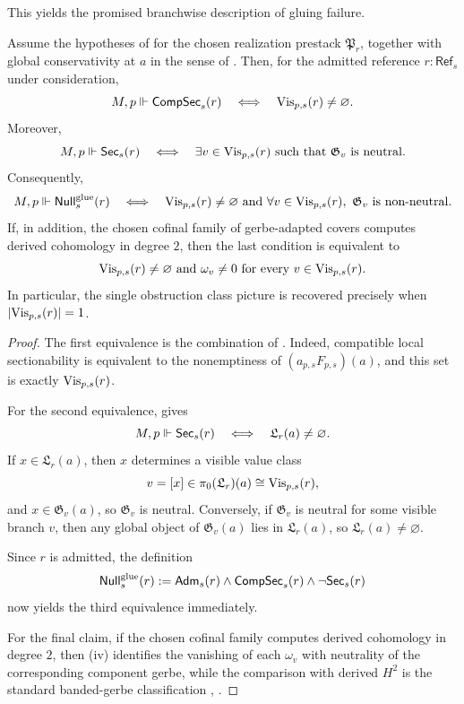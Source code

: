 This yields the promised branchwise description of gluing failure.

\begin{proposition}\label{thm:gerbe-null-semantics}
Assume the hypotheses of  for the chosen realization prestack $\mathfrak P_r$, together with global conservativity at $a$ in the sense of . Then, for the admitted reference $r:\mathsf{Ref}_s$ under consideration,
\[
M,p\Vdash \mathsf{CompSec}_s(r)
\quad\Longleftrightarrow\quad
\mathrm{Vis}_{p,s}(r)\neq\varnothing.
\]
Moreover,
\[
M,p\Vdash \mathsf{Sec}_s(r)
\quad\Longleftrightarrow\quad
\exists v\in \mathrm{Vis}_{p,s}(r)\ \text{such that}\ \mathfrak G_v\ \text{is neutral}.
\]
Consequently,
\[
M,p\Vdash \mathsf{Null}^{\mathrm{glue}}_s(r)
\quad\Longleftrightarrow\quad
\mathrm{Vis}_{p,s}(r)\neq\varnothing
\ \text{and}\
\forall v\in \mathrm{Vis}_{p,s}(r),\ \mathfrak G_v\ \text{is non-neutral}.
\]
If, in addition, the chosen cofinal family of gerbe-adapted covers computes derived cohomology in degree $2$, then the last condition is equivalent to
\[
\mathrm{Vis}_{p,s}(r)\neq\varnothing
\ \text{and}\
\omega_v\neq 0\ \text{for every}\ v\in \mathrm{Vis}_{p,s}(r).
\]
In particular, the single obstruction class picture is recovered precisely when $|\mathrm{Vis}_{p,s}(r)|=1$.
\end{proposition}

\begin{proof}
The first equivalence is the combination of . Indeed, compatible local sectionability is equivalent to the nonemptiness of $(a_{p,s}F_{p,s})(a)$, and this set is exactly $\mathrm{Vis}_{p,s}(r)$.

For the second equivalence, \Cref{prop:no-new-global-objects} gives
\[
M,p\Vdash \mathsf{Sec}_s(r)
\quad\Longleftrightarrow\quad
\mathfrak L_r(a)\neq\varnothing.
\]
If $x\in \mathfrak L_r(a)$, then $x$ determines a visible value class
\[
v=[x]\in \pi_0(\mathfrak L_r)(a)\cong \mathrm{Vis}_{p,s}(r),
\]
and $x\in \mathfrak G_v(a)$, so $\mathfrak G_v$ is neutral. Conversely, if $\mathfrak G_v$ is neutral for some visible branch $v$, then any global object of $\mathfrak G_v(a)$ lies in $\mathfrak L_r(a)$, so $\mathfrak L_r(a)\neq\varnothing$.

Since $r$ is admitted, the definition
\[
\mathsf{Null}^{\mathrm{glue}}_s(r):=\mathsf{Adm}_s(r)\land \mathsf{CompSec}_s(r)\land \neg\mathsf{Sec}_s(r)
\]
now yields the third equivalence immediately.

For the final claim, if the chosen cofinal family computes derived cohomology in degree $2$, then (iv) identifies the vanishing of each $\omega_v$ with neutrality of the corresponding component gerbe, while the comparison with derived $H^2$ is the standard banded-gerbe classification \cite[Chap.~IV]{Giraud1971}, \cite[Tag 06NY]{StacksProject}.
\end{proof}

